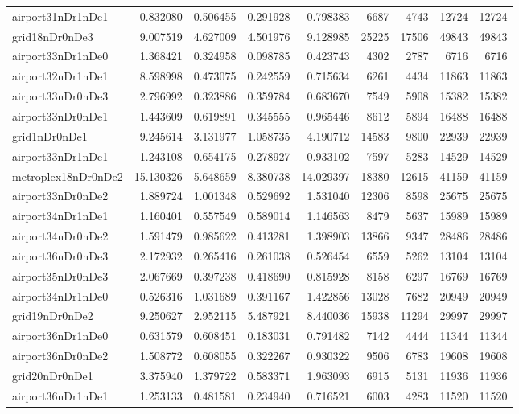 \begin{longtable}{|l|r|r|r|r|r|r|r|r|}
airport31nDr1nDe1 & 0.832080 & 0.506455 & 0.291928 & 0.798383 & 6687 & 4743 & 12724 & 12724 \\
grid18nDr0nDe3 & 9.007519 & 4.627009 & 4.501976 & 9.128985 & 25225 & 17506 & 49843 & 49843 \\
airport33nDr1nDe0 & 1.368421 & 0.324958 & 0.098785 & 0.423743 & 4302 & 2787 & 6716 & 6716 \\
airport32nDr1nDe1 & 8.598998 & 0.473075 & 0.242559 & 0.715634 & 6261 & 4434 & 11863 & 11863 \\
airport33nDr0nDe3 & 2.796992 & 0.323886 & 0.359784 & 0.683670 & 7549 & 5908 & 15382 & 15382 \\
airport33nDr0nDe1 & 1.443609 & 0.619891 & 0.345555 & 0.965446 & 8612 & 5894 & 16488 & 16488 \\
grid1nDr0nDe1 & 9.245614 & 3.131977 & 1.058735 & 4.190712 & 14583 & 9800 & 22939 & 22939 \\
airport33nDr1nDe1 & 1.243108 & 0.654175 & 0.278927 & 0.933102 & 7597 & 5283 & 14529 & 14529 \\
metroplex18nDr0nDe2 & 15.130326 & 5.648659 & 8.380738 & 14.029397 & 18380 & 12615 & 41159 & 41159 \\
airport33nDr0nDe2 & 1.889724 & 1.001348 & 0.529692 & 1.531040 & 12306 & 8598 & 25675 & 25675 \\
airport34nDr1nDe1 & 1.160401 & 0.557549 & 0.589014 & 1.146563 & 8479 & 5637 & 15989 & 15989 \\
airport34nDr0nDe2 & 1.591479 & 0.985622 & 0.413281 & 1.398903 & 13866 & 9347 & 28486 & 28486 \\
airport36nDr0nDe3 & 2.172932 & 0.265416 & 0.261038 & 0.526454 & 6559 & 5262 & 13104 & 13104 \\
airport35nDr0nDe3 & 2.067669 & 0.397238 & 0.418690 & 0.815928 & 8158 & 6297 & 16769 & 16769 \\
airport34nDr1nDe0 & 0.526316 & 1.031689 & 0.391167 & 1.422856 & 13028 & 7682 & 20949 & 20949 \\
grid19nDr0nDe2 & 9.250627 & 2.952115 & 5.487921 & 8.440036 & 15938 & 11294 & 29997 & 29997 \\
airport36nDr1nDe0 & 0.631579 & 0.608451 & 0.183031 & 0.791482 & 7142 & 4444 & 11344 & 11344 \\
airport36nDr0nDe2 & 1.508772 & 0.608055 & 0.322267 & 0.930322 & 9506 & 6783 & 19608 & 19608 \\
grid20nDr0nDe1 & 3.375940 & 1.379722 & 0.583371 & 1.963093 & 6915 & 5131 & 11936 & 11936 \\
airport36nDr1nDe1 & 1.253133 & 0.481581 & 0.234940 & 0.716521 & 6003 & 4283 & 11520 & 11520 \\

\end{longtable}

